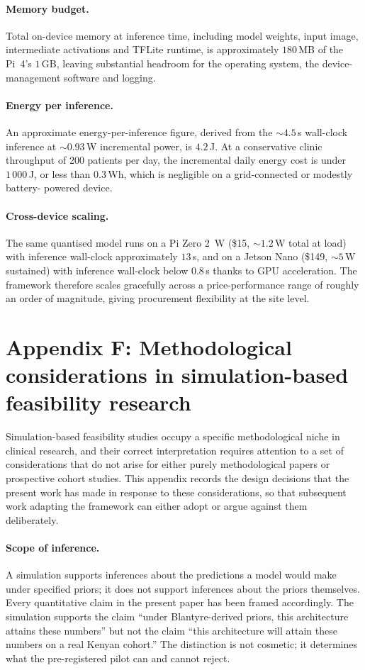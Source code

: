 \documentclass[twocolumn,10pt]{article}
\begin{document}
\paragraph{Memory budget.}
Total on-device memory at inference time, including model
weights, input image, intermediate activations and TFLite
runtime, is approximately $180$\,MB of the Pi~4's $1$\,GB,
leaving substantial headroom for the operating system, the
device-management software and logging.

\paragraph{Energy per inference.}
An approximate energy-per-inference figure, derived from the
$\sim 4.5$\,s wall-clock inference at $\sim 0.93$\,W
incremental power, is $4.2$\,J. At a conservative clinic
throughput of 200 patients per day, the incremental daily
energy cost is under $1\,000$\,J, or less than $0.3$\,Wh,
which is negligible on a grid-connected or modestly battery-%
powered device.

\paragraph{Cross-device scaling.}
The same quantised model runs on a Pi Zero 2~W (\$15,
$\sim\!1.2$\,W total at load) with inference wall-clock
approximately $13$\,s, and on a Jetson Nano (\$149,
$\sim\!5$\,W sustained) with inference wall-clock below
$0.8$\,s thanks to GPU acceleration. The framework therefore
scales gracefully across a price-performance range of
roughly an order of magnitude, giving procurement flexibility
at the site level.

\section*{Appendix F: Methodological considerations in
simulation-based feasibility research}
\label{app:sim-methodology}
Simulation-based feasibility studies occupy a specific
methodological niche in clinical research, and their correct
interpretation requires attention to a set of considerations
that do not arise for either purely methodological papers or
prospective cohort studies. This appendix records the design
decisions that the present work has made in response to these
considerations, so that subsequent work adapting the framework
can either adopt or argue against them deliberately.

\paragraph{Scope of inference.}
A simulation supports inferences about the predictions a model
would make under specified priors; it does not support inferences
about the priors themselves. Every quantitative claim in the
present paper has been framed accordingly. The simulation
supports the claim ``under Blantyre-derived priors, this
architecture attains these numbers'' but not the claim ``this
architecture will attain these numbers on a real Kenyan cohort.''
The distinction is not cosmetic; it determines what the
pre-registered pilot can and cannot reject.
\end{document}
